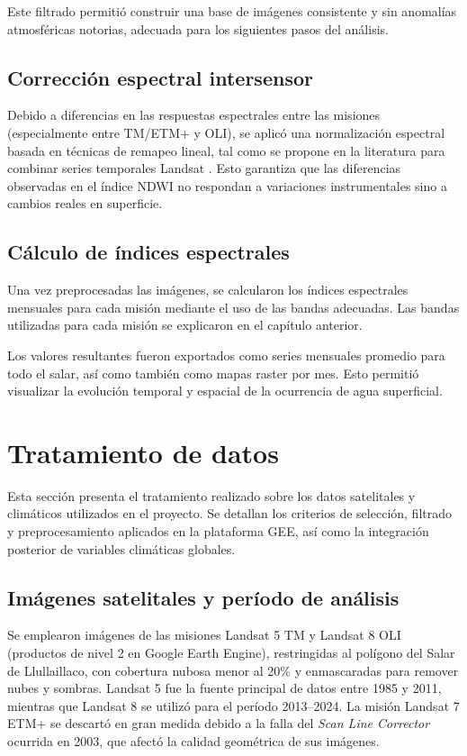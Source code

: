 Este filtrado permitió construir una base de imágenes consistente y sin anomalías atmosféricas notorias, adecuada para los siguientes pasos del análisis.



\subsection{Corrección espectral intersensor}

Debido a diferencias en las respuestas espectrales entre las misiones (especialmente entre TM/ETM+ y OLI), se aplicó una normalización espectral basada en técnicas de remapeo lineal, tal como se propone en la literatura para combinar series temporales Landsat \parencite{roy2016characterization, roy2014landsat8}. Esto garantiza que las diferencias observadas en el índice NDWI no respondan a variaciones instrumentales sino a cambios reales en superficie.

\subsection{Cálculo de índices espectrales}

Una vez preprocesadas las imágenes, se calcularon los índices espectrales mensuales para cada misión mediante el uso de las bandas adecuadas. Las bandas utilizadas para cada misión se explicaron en el capítulo anterior.

Los valores resultantes fueron exportados como series mensuales promedio para todo el salar, así como también como mapas raster por mes. Esto permitió visualizar la evolución temporal y espacial de la ocurrencia de agua superficial.

\section{Tratamiento de datos }

Esta sección presenta el tratamiento realizado sobre los datos satelitales y climáticos utilizados en el proyecto. Se detallan los criterios de selección, filtrado y preprocesamiento aplicados en la plataforma GEE, así como la integración posterior de variables climáticas globales.

\subsection{Imágenes satelitales y período de análisis}

Se emplearon imágenes de las misiones Landsat 5 TM y Landsat 8 OLI (productos de nivel 2 en Google Earth Engine), restringidas al polígono del Salar de Llullaillaco, con cobertura nubosa menor al 20\% y enmascaradas para remover nubes y sombras. Landsat 5 fue la fuente principal de datos entre 1985 y 2011, mientras que Landsat 8 se utilizó para el período 2013–2024. La misión Landsat 7 ETM+ se descartó en gran medida debido a la falla del \textit{Scan Line Corrector} ocurrida en 2003, que afectó la calidad geométrica de sus imágenes.


